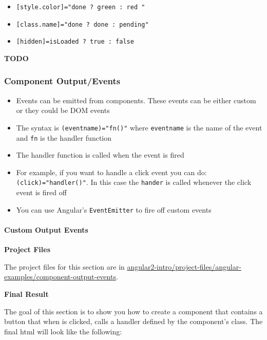\documentclass[12pt,]{article}
\providecommand{\tightlist}{%
  \setlength{\itemsep}{0pt}\setlength{\parskip}{0pt}}
\let\oldparagraph\paragraph
\renewcommand{\paragraph}[1]{\oldparagraph{#1}\mbox{}}
\begin{document}
\begin{itemize}
\tightlist
\item
  \texttt{{[}style.color{]}="done\ ?\ \textquotesingle{}green\textquotesingle{}\ :\ \textquotesingle{}red\textquotesingle{}\ "}
\item
  \texttt{{[}class.name{]}="done\ ?\ \textquotesingle{}done\textquotesingle{}\ :\ \textquotesingle{}pending\textquotesingle{}"}
\item
  \texttt{{[}hidden{]}=isLoaded\ ?\ true\ :\ false}
\end{itemize}

\textbf{TODO}

\subsubsection{Component Output/Events}\label{component-outputevents}

\begin{itemize}
\tightlist
\item
  Events can be emitted from components. These events can be either
  custom or they could be DOM events
\item
  The syntax is \texttt{(eventname)="fn()"} where \texttt{eventname} is
  the name of the event and \texttt{fn} is the handler function
\item
  The handler function is called when the event is fired
\item
  For example, if you want to handle a click event you can do:
  \texttt{(click)="handler()"}. In this case the \texttt{hander} is
  called whenever the click event is fired off
\item
  You can use Angular's \texttt{EventEmitter} to fire off custom events
\end{itemize}

\paragraph{Custom Output Events}\label{custom-output-events}

\textbf{Project Files}

The project files for this section are in
\href{https://github.com/st32lth/angular2-intro/tree/master/project-files/angular-examples/component-output-events}{angular2-intro/project-files/angular-examples/component-output-events}.

\textbf{Final Result}

The goal of this section is to show you how to create a component that
contains a button that when is clicked, calls a handler defined by the
component's class. The final html will look like the following:
\end{document}
